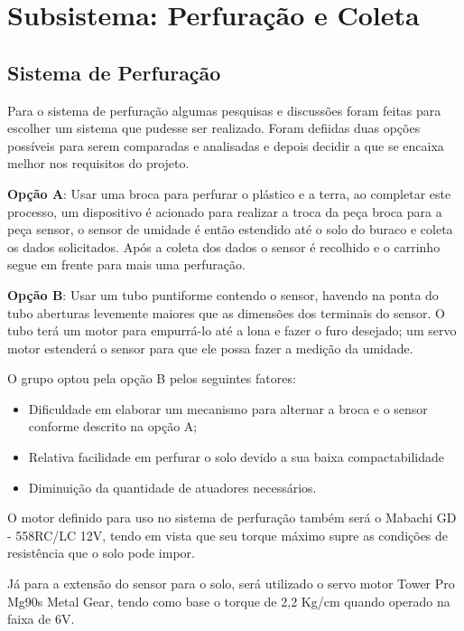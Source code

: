 \section{Subsistema: Perfuração e Coleta}

  \subsection{Sistema de Perfuração}
  
  Para o sistema de perfuração algumas pesquisas e discussões foram feitas para escolher um sistema que pudesse ser realizado. Foram defiidas duas opções possíveis para serem comparadas e analisadas e depois decidir a que se encaixa melhor nos requisitos do projeto.

  \textbf{Opção A}: Usar uma broca para perfurar o plástico e a terra, ao completar este
  processo, um dispositivo é acionado para realizar a troca da peça broca para
  a peça sensor, o sensor de umidade é então estendido até o solo do buraco e
  coleta os dados solicitados. Após a coleta dos dados o sensor é recolhido e o
  carrinho segue em frente para mais uma perfuração.

  \textbf{Opção B}: Usar um tubo puntiforme contendo o sensor, havendo na ponta do tubo
  aberturas levemente maiores que as dimensões dos terminais do sensor. O tubo
  terá um motor para empurrá-lo até a lona e fazer o furo desejado; um servo
  motor estenderá o sensor para que ele possa fazer a medição da umidade.

  O grupo optou pela opção B pelos seguintes fatores:

  \begin{itemize}
    \item Dificuldade em elaborar um mecanismo para alternar a broca e o sensor
    conforme descrito na opção A;
    \item Relativa facilidade em perfurar o solo devido a sua baixa compactabilidade
    \item Diminuição da quantidade de atuadores necessários.
  \end{itemize}

  O motor definido para uso no sistema de perfuração também será o
  Mabachi GD - 558RC/LC 12V, tendo em vista que seu torque máximo supre as
  condições de resistência que o solo pode impor.

  Já para a extensão do sensor para o solo, será utilizado o servo motor Tower
  Pro Mg90s Metal Gear, tendo como base o torque de 2,2 Kg/cm quando operado na faixa de 6V.
